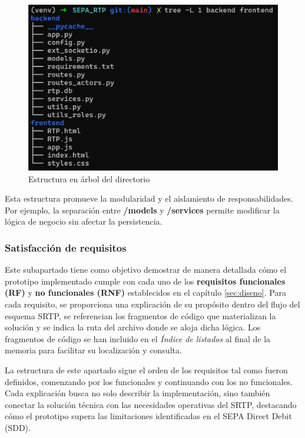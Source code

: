\begin{figure}[htbp]
  \centering
  \includegraphics[width=.85\textwidth]{Imagenes/treeB.pdf}
  \caption{Estructura en árbol del directorio}
  \label{fig:treeB}
\end{figure}

Esta estructura promueve la modularidad y el aislamiento de responsabilidades. Por ejemplo, la separación entre \textbf{/models} y \textbf{/services} permite modificar la lógica de negocio sin afectar la persistencia.

\subsubsection{Satisfacción de requisitos}
Este subapartado tiene como objetivo demostrar de manera detallada cómo el prototipo implementado cumple con cada uno de los \textbf{requisitos funcionales (RF)} y \textbf{no funcionales (RNF)} establecidos en el capítulo \ref{sec:diseno}. Para cada requisito, se proporciona una explicación de su propósito dentro del flujo del esquema SRTP, se referencian los fragmentos de código que materializan la solución y se indica la ruta del archivo donde se aloja dicha lógica. Los fragmentos de código se han incluido en el \emph{Índice de listados} al final de la memoria para facilitar su localización y consulta.

La estructura de este apartado sigue el orden de los requisitos tal como fueron definidos, comenzando por los funcionales y continuando con los no funcionales. Cada explicación busca no solo describir la implementación, sino también conectar la solución técnica con las necesidades operativas del SRTP, destacando cómo el prototipo supera las limitaciones identificadas en el SEPA Direct Debit (SDD).

